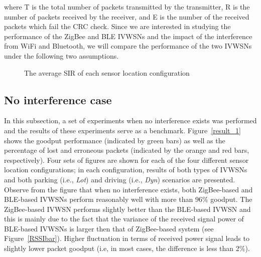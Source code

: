 \documentclass[journal]{IEEEtran}
\begin{document}
where T is the total number of packets transmitted by the transmitter, R is the number of packets received by the receiver, and E is the number of the received packets which fail the CRC check. 
Since we are interested in studying the performance of the ZigBee and BLE IVWSNs and the impact of the interference from WiFi and Bluetooth, we will compare the performance of the two IVWSNs under the following two assumptions.









\begin{figure}[tbp]
\centering
{}
\caption[]{The average SIR of each sensor location configuration}
\label{SIRbar}
\end{figure}








\subsection{No interference case}




In this subsection, a set of experiments when no interference exists was performed and the results of these experiments serve as a benchmark. Figure~\ref{result_1} shows the goodput performance (indicated by green bars) as well as the percentage of lost and erroneous packets (indicated by the orange and red bars, respectively). Four sets of figures are shown for each of the four different sensor location configurations; in each configuration, results of both types of IVWSNs and both parking (i.e., \textit{Lot}) and driving (i.e., \textit{Dyn}) scenarios are presented. Observe from the figure that when no interference exists, both ZigBee-based and BLE-based IVWSNs perform reasonably well with more than 96\% goodput. The ZigBee-based IVWSN performs slightly better than the BLE-based IVWSN and this is mainly due to the fact that the variance of the received signal power of BLE-based IVWSNs is larger then that of ZigBee-based system (see Figure~\ref{RSSIbar}). Higher fluctuation in terms of received power signal leads to slightly lower packet goodput (i.e, in most cases, the difference is less than 2\%).
\end{document}
